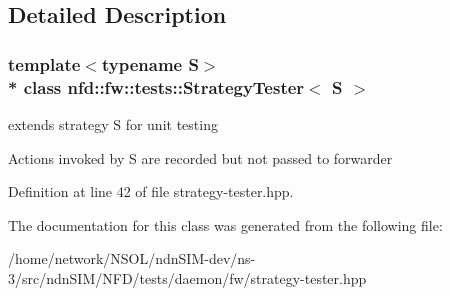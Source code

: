 \subsection{Detailed Description}
\subsubsection*{template$<$typename S$>$\\*
class nfd\+::fw\+::tests\+::\+Strategy\+Tester$<$ S $>$}

extends strategy S for unit testing 

Actions invoked by S are recorded but not passed to forwarder 

Definition at line 42 of file strategy-\/tester.\+hpp.



The documentation for this class was generated from the following file\+:\begin{DoxyCompactItemize}
\item 
/home/network/\+N\+S\+O\+L/ndn\+S\+I\+M-\/dev/ns-\/3/src/ndn\+S\+I\+M/\+N\+F\+D/tests/daemon/fw/strategy-\/tester.\+hpp\end{DoxyCompactItemize}
